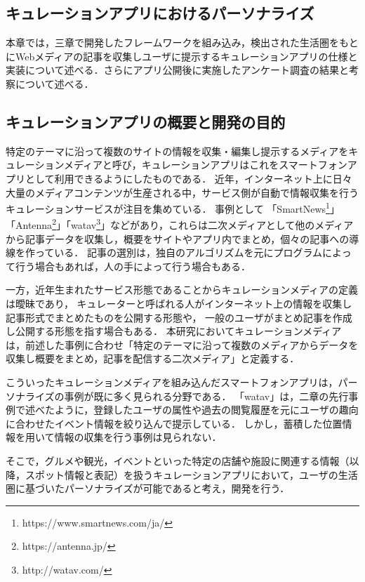 \documentclass[a4paper]{jsarticle}
\begin{document}
\begin{enumerate}
\begin{enumerate}


\section{キュレーションアプリにおけるパーソナライズ}
本章では，三章で開発したフレームワークを組み込み，検出された生活圏をもとにWebメディアの記事を収集しユーザに提示するキュレーションアプリの仕様と実装について述べる．さらにアプリ公開後に実施したアンケート調査の結果と考察について述べる．


\subsection{キュレーションアプリの概要と開発の目的}
特定のテーマに沿って複数のサイトの情報を収集・編集し提示するメディアをキュレーションメディアと呼び，キュレーションアプリはこれをスマートフォンアプリとして利用できるようにしたものである．
近年，インターネット上に日々大量のメディアコンテンツが生産される中，サービス側が自動で情報収集を行うキュレーションサービスが注目を集めている\cite{ohmukai}．
事例として
「SmartNews\footnote{https://www.smartnews.com/ja/}」「Antenna\footnote{https://antenna.jp/}」「watav\footnote{http://watav.com/}」などがあり，これらは二次メディアとして他のメディアから記事データを収集し，概要をサイトやアプリ内でまとめ，個々の記事への導線を作っている．
記事の選別は，独自のアルゴリズムを元にプログラムによって行う場合もあれば，人の手によって行う場合もある．

一方，近年生まれたサービス形態であることからキュレーションメディアの定義は曖昧であり，
キュレーターと呼ばれる人がインターネット上の情報を収集し記事形式でまとめたものを公開する形態や，
一般のユーザがまとめ記事を作成し公開する形態を指す場合もある．
本研究においてキュレーションメディアは，前述した事例に合わせ「特定のテーマに沿って複数のメディアからデータを収集し概要をまとめ，記事を配信する二次メディア」と定義する．

こういったキュレーションメディアを組み込んだスマートフォンアプリは，パーソナライズの事例が既に多く見られる分野である．
「watav」は，二章の先行事例で述べたように，登録したユーザの属性や過去の閲覧履歴を元にユーザの趣向に合わせたイベント情報を絞り込んで提示している．
しかし，蓄積した位置情報を用いて情報の収集を行う事例は見られない．

そこで，グルメや観光，イベントといった特定の店舗や施設に関連する情報（以降，スポット情報と表記）を扱うキュレーションアプリにおいて，ユーザの生活圏に基づいたパーソナライズが可能であると考え，開発を行う．



\end{enumerate}
\end{enumerate}
\end{document}
